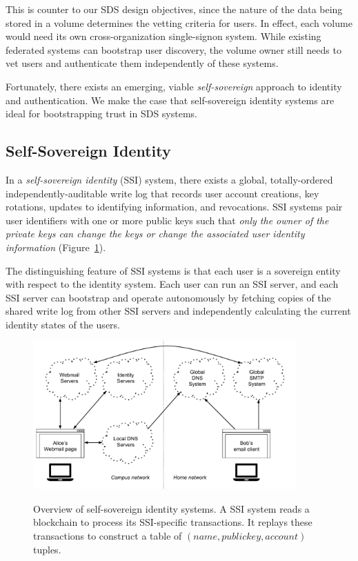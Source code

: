 This is counter to our SDS design objectives, since the nature of the data being stored
in a volume determines the vetting criteria for users.  In effect, each volume
would need its own cross-organization single-signon system.  While existing
federated systems can bootstrap user discovery, the volume owner still
needs to vet users and authenticate them independently of these systems.

Fortunately, there exists an emerging, viable \emph{self-sovereign} approach
to identity and authentication.  We make the case that self-sovereign identity
systems are ideal for bootstrapping trust in SDS systems.

\subsection{Self-Sovereign Identity}
\label{sec:chap2-ssi}

In a \emph{self-sovereign identity} (SSI) system, there exists a global,
totally-ordered independently-auditable write log that records user account creations, key rotations,
updates to identifying information, and revocations.  SSI systems 
pair user identifiers with one or more public keys such that \emph{only the 
owner of the private keys can 
change the keys or change the associated user identity information}
(Figure~\ref{fig:chap2-ssi-system}).

The distinguishing feature of SSI systems is that each user is a sovereign
entity with respect to the identity system.  Each user can run an SSI server,
and each SSI server can bootstrap and operate autonomously by fetching copies
of the shared write log from other SSI servers and independently
calculating the current identity states of the users.

\begin{figure}[h]
   \caption{Overview of self-sovereign identity systems.  A SSI system reads a
   blockchain to process its SSI-specific transactions.  It replays these
   transactions to construct a table of $(name, public key, account)$ tuples.}
   \centering
   \includegraphics[width=0.9\textwidth,page=14]{figures/dissertation-figures}
   \label{fig:chap2-ssi-system}
\end{figure}

